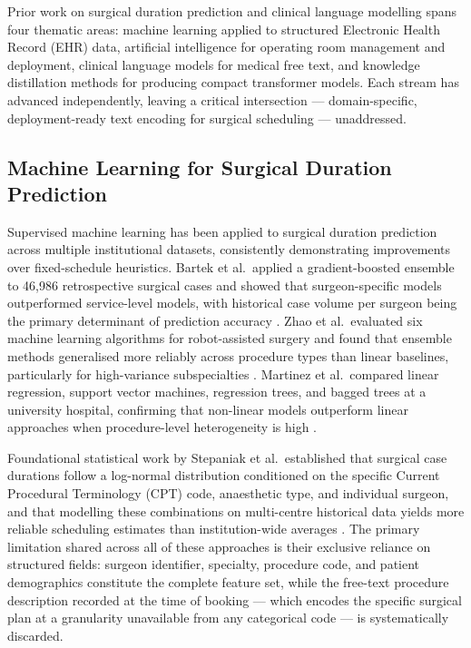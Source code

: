 
Prior work on surgical duration prediction and clinical language modelling spans four thematic areas: machine learning applied to structured Electronic Health Record (EHR) data, artificial intelligence for operating room management and deployment, clinical language models for medical free text, and knowledge distillation methods for producing compact transformer models. Each stream has advanced independently, leaving a critical intersection — domain-specific, deployment-ready text encoding for surgical scheduling — unaddressed.

\subsection{Machine Learning for Surgical Duration Prediction}
\label{sec:rw_ml}

Supervised machine learning has been applied to surgical duration prediction across multiple institutional datasets, consistently demonstrating improvements over fixed-schedule heuristics. Bartek et al.\ applied a gradient-boosted ensemble to 46{,}986 retrospective surgical cases and showed that surgeon-specific models outperformed service-level models, with historical case volume per surgeon being the primary determinant of prediction accuracy \cite{bartek2019improving}. Zhao et al.\ evaluated six machine learning algorithms for robot-assisted surgery and found that ensemble methods generalised more reliably across procedure types than linear baselines, particularly for high-variance subspecialties \cite{zhao2019machine}. Martinez et al.\ compared linear regression, support vector machines, regression trees, and bagged trees at a university hospital, confirming that non-linear models outperform linear approaches when procedure-level heterogeneity is high \cite{martinez2021machine}.

Foundational statistical work by Stepaniak et al.\ established that surgical case durations follow a log-normal distribution conditioned on the specific Current Procedural Terminology (CPT) code, anaesthetic type, and individual surgeon, and that modelling these combinations on multi-centre historical data yields more reliable scheduling estimates than institution-wide averages \cite{stepaniak2009modeling,stepaniak2010modeling}. The primary limitation shared across all of these approaches is their exclusive reliance on structured fields: surgeon identifier, specialty, procedure code, and patient demographics constitute the complete feature set, while the free-text procedure description recorded at the time of booking — which encodes the specific surgical plan at a granularity unavailable from any categorical code — is systematically discarded.

